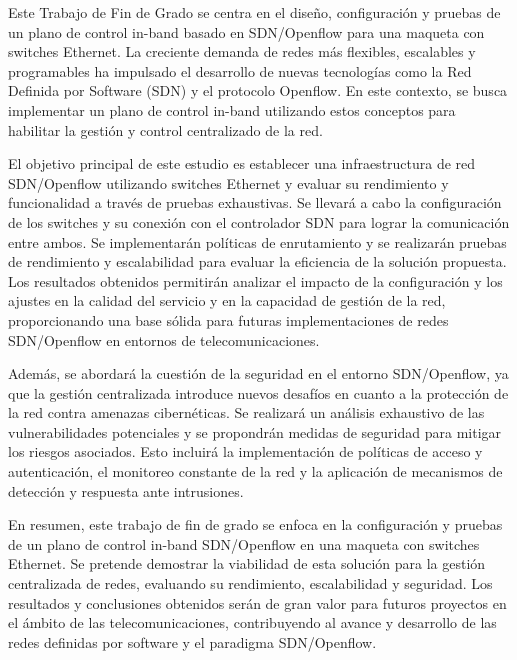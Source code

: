 \documentclass[a4paper, 12pt]{book}
\begin{document}
	Este Trabajo de Fin de Grado se centra en el diseño, configuración y pruebas de un plano de control in-band basado en SDN/Openflow para una maqueta con switches Ethernet. La creciente demanda de redes más flexibles, escalables y programables ha impulsado el desarrollo de nuevas tecnologías como la Red Definida por Software (SDN) y el protocolo Openflow. En este contexto, se busca implementar un plano de control in-band utilizando estos conceptos para habilitar la gestión y control centralizado de la red.
	
	El objetivo principal de este estudio es establecer una infraestructura de red SDN/Openflow utilizando switches Ethernet y evaluar su rendimiento y funcionalidad a través de pruebas exhaustivas. Se llevará a cabo la configuración de los switches y su conexión con el controlador SDN para lograr la comunicación entre ambos. Se implementarán políticas de enrutamiento y se realizarán pruebas de rendimiento y escalabilidad para evaluar la eficiencia de la solución propuesta. Los resultados obtenidos permitirán analizar el impacto de la configuración y los ajustes en la calidad del servicio y en la capacidad de gestión de la red, proporcionando una base sólida para futuras implementaciones de redes SDN/Openflow en entornos de telecomunicaciones.
	
	Además, se abordará la cuestión de la seguridad en el entorno SDN/Openflow, ya que la gestión centralizada introduce nuevos desafíos en cuanto a la protección de la red contra amenazas cibernéticas. Se realizará un análisis exhaustivo de las vulnerabilidades potenciales y se propondrán medidas de seguridad para mitigar los riesgos asociados. Esto incluirá la implementación de políticas de acceso y autenticación, el monitoreo constante de la red y la aplicación de mecanismos de detección y respuesta ante intrusiones.
	
	En resumen, este trabajo de fin de grado se enfoca en la configuración y pruebas de un plano de control in-band SDN/Openflow en una maqueta con switches Ethernet. Se pretende demostrar la viabilidad de esta solución para la gestión centralizada de redes, evaluando su rendimiento, escalabilidad y seguridad. Los resultados y conclusiones obtenidos serán de gran valor para futuros proyectos en el ámbito de las telecomunicaciones, contribuyendo al avance y desarrollo de las redes definidas por software y el paradigma SDN/Openflow.
	
	
\end{document}
